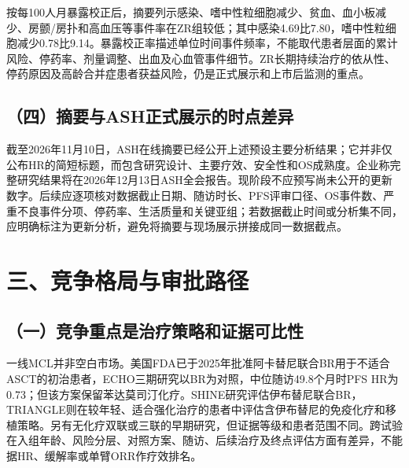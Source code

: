 \documentclass[a4paper,10pt,fontset=none]{ctexart}
\begin{document}
按每100人月暴露校正后，摘要列示感染、嗜中性粒细胞减少、贫血、血小板减少、房颤/房扑和高血压等事件率在ZR组较低；其中感染4.69比7.80，嗜中性粒细胞减少0.78比9.14。暴露校正率描述单位时间事件频率，不能取代患者层面的累计风险、停药率、剂量调整、出血及心血管事件细节。ZR长期持续治疗的依从性、停药原因及高龄合并症患者获益风险，仍是正式展示和上市后监测的重点。

\subsection*{（四）摘要与ASH正式展示的时点差异}
截至2026年11月10日，ASH在线摘要已经公开上述预设主要分析结果；它并非仅公布HR的简短标题，而包含研究设计、主要疗效、安全性和OS成熟度。企业称完整研究结果将在2026年12月13日ASH全会报告。现阶段不应预写尚未公开的更新数字。后续应逐项核对数据截止日期、随访时长、PFS评审口径、OS事件数、严重不良事件分项、停药率、生活质量和关键亚组；若数据截止时间或分析集不同，应明确标注为更新分析，避免将摘要与现场展示拼接成同一数据截点。

\section*{三、竞争格局与审批路径}
\subsection*{（一）竞争重点是治疗策略和证据可比性}
一线MCL并非空白市场。美国FDA已于2025年批准阿卡替尼联合BR用于不适合ASCT的初治患者，ECHO三期研究以BR为对照，中位随访49.8个月时PFS HR为0.73；但该方案保留苯达莫司汀化疗。SHINE研究评估伊布替尼联合BR，TRIANGLE则在较年轻、适合强化治疗的患者中评估含伊布替尼的免疫化疗和移植策略。另有无化疗双联或三联的早期研究，但证据等级和患者范围不同。跨试验在入组年龄、风险分层、对照方案、随访、后续治疗及终点评估方面有差异，不能据HR、缓解率或单臂ORR作疗效排名。
\end{document}
